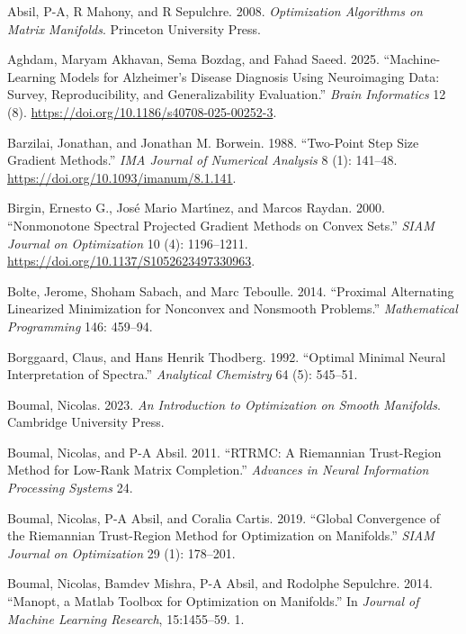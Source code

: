 \documentclass[
]{article}
\newlength{\cslhangindent}
\newenvironment{CSLReferences}[2] %
 {\begin{list}{}{%
  \setlength{\itemindent}{0pt}
  \setlength{\leftmargin}{0pt}
  \setlength{\parsep}{0pt}
  \ifodd #1
   \setlength{\leftmargin}{\cslhangindent}
   \setlength{\itemindent}{-1\cslhangindent}
  \fi
  \setlength{\itemsep}{#2\baselineskip}}}
 {\end{list}}
\begin{document}
\label{refs}
\begin{CSLReferences}{1}{0}
Absil, P-A, R Mahony, and R Sepulchre. 2008. \emph{Optimization Algorithms on Matrix Manifolds}. Princeton University Press.

Aghdam, Maryam Akhavan, Sema Bozdag, and Fahad Saeed. 2025. {``Machine-Learning Models for Alzheimer's Disease Diagnosis Using Neuroimaging Data: Survey, Reproducibility, and Generalizability Evaluation.''} \emph{Brain Informatics} 12 (8). \url{https://doi.org/10.1186/s40708-025-00252-3}.

Barzilai, Jonathan, and Jonathan M. Borwein. 1988. {``Two-Point Step Size Gradient Methods.''} \emph{IMA Journal of Numerical Analysis} 8 (1): 141--48. \url{https://doi.org/10.1093/imanum/8.1.141}.

Birgin, Ernesto G., José Mario Martı́nez, and Marcos Raydan. 2000. {``Nonmonotone Spectral Projected Gradient Methods on Convex Sets.''} \emph{SIAM Journal on Optimization} 10 (4): 1196--1211. \url{https://doi.org/10.1137/S1052623497330963}.

Bolte, Jerome, Shoham Sabach, and Marc Teboulle. 2014. {``Proximal Alternating Linearized Minimization for Nonconvex and Nonsmooth Problems.''} \emph{Mathematical Programming} 146: 459--94.

Borggaard, Claus, and Hans Henrik Thodberg. 1992. {``Optimal Minimal Neural Interpretation of Spectra.''} \emph{Analytical Chemistry} 64 (5): 545--51.

Boumal, Nicolas. 2023. \emph{An Introduction to Optimization on Smooth Manifolds}. Cambridge University Press.

Boumal, Nicolas, and P-A Absil. 2011. {``RTRMC: A Riemannian Trust-Region Method for Low-Rank Matrix Completion.''} \emph{Advances in Neural Information Processing Systems} 24.

Boumal, Nicolas, P-A Absil, and Coralia Cartis. 2019. {``Global Convergence of the Riemannian Trust-Region Method for Optimization on Manifolds.''} \emph{SIAM Journal on Optimization} 29 (1): 178--201.

Boumal, Nicolas, Bamdev Mishra, P-A Absil, and Rodolphe Sepulchre. 2014. {``{Manopt}, a {M}atlab Toolbox for Optimization on Manifolds.''} In \emph{Journal of Machine Learning Research}, 15:1455--59. 1.


\end{CSLReferences}
\end{document}
